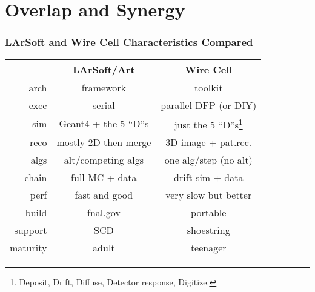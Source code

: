 \documentclass[xcolor=dvipsnames]{beamer}
\begin{document}




\section{Overlap and Synergy}

\begin{frame}
  \frametitle{LArSoft and Wire Cell Characteristics Compared}

  \begin{center}
    \begin{tabular}[h]{|r|c|c|}
      \hline
      & LArSoft/Art & Wire Cell \\
      \hline
      arch & framework & toolkit \\
      exec & serial & parallel DFP (or DIY) \\
      sim & Geant4 + the 5 ``D''s &  just the 5 ``D''s\footnote{Deposit, Drift, Diffuse, Detector response, Digitize.} \\
      reco & mostly 2D then merge & 3D image + pat.rec. \\
      algs & alt/competing algs & one alg/step (no alt) \\
      chain & full MC + data & drift sim + data \\
      perf & fast and good & very slow but better \\
      build & fnal.gov  & portable \\
      support & SCD & shoestring \\
      maturity & adult & teenager \\
      \hline
    \end{tabular}
  \end{center}

\end{frame}

\end{document}
